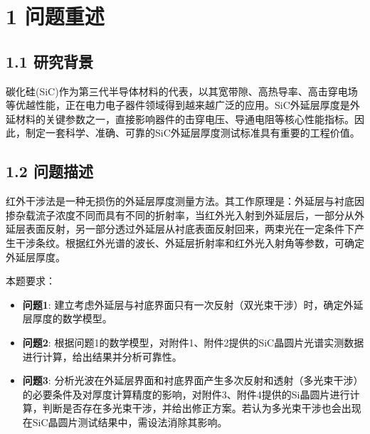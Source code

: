\documentclass[withoutpreface]{cumcmthesis}
\begin{document}
\maketitle

\begin{abstract}
本研究针对碳化硅(SiC)外延层厚度测量问题，基于红外干涉光谱法建立了完整的数学模型并实现了精确测量。针对问题1，建立了考虑外延层与衬底界面单次反射的双光束干涉模型，推导了厚度计算公式$d=1/(2n\Delta\sigma)$；针对问题2，设计了基于峰值检测和统计分析的厚度求解算法，对附件1、附件2的SiC晶圆片进行计算，得到SiC-1厚度为$24.58\,\mu\text{m}$，SiC-2厚度为$24.02\,\mu\text{m}$；针对问题3，深入分析了多光束Fabry-Perot干涉产生的必要条件，发现Si样品的干涉条纹对比度$K>0.99$，确认存在显著多光束干涉效应，而SiC样品$K\approx0.98$，表明其多光束效应相对较弱。对Si样品的分析得到Si-1厚度为$3.67\,\mu\text{m}$，Si-2厚度为$3.52\,\mu\text{m}$。研究结果表明，所建立的模型和算法能够有效测定SiC和Si外延层厚度，为半导体外延材料的无损检测提供了科学依据。

\textbf{关键词}: 红外干涉；外延层厚度；双光束干涉；多光束干涉；Fabry-Perot干涉仪；Sellmeier色散公式
\end{abstract}

\section{1 问题重述}

\subsection{1.1 研究背景}
碳化硅(SiC)作为第三代半导体材料的代表，以其宽带隙、高热导率、高击穿电场等优越性能，正在电力电子器件领域得到越来越广泛的应用。SiC外延层厚度是外延材料的关键参数之一，直接影响器件的击穿电压、导通电阻等核心性能指标。因此，制定一套科学、准确、可靠的SiC外延层厚度测试标准具有重要的工程价值。

\subsection{1.2 问题描述}
红外干涉法是一种无损伤的外延层厚度测量方法。其工作原理是：外延层与衬底因掺杂载流子浓度不同而具有不同的折射率，当红外光入射到外延层后，一部分从外延层表面反射，另一部分透过外延层从衬底表面反射回来，两束光在一定条件下产生干涉条纹。根据红外光谱的波长、外延层折射率和红外光入射角等参数，可确定外延层厚度。

本题要求：
\begin{itemize}
\item \textbf{问题1}: 建立考虑外延层与衬底界面只有一次反射（双光束干涉）时，确定外延层厚度的数学模型。
\item \textbf{问题2}: 根据问题1的数学模型，对附件1、附件2提供的SiC晶圆片光谱实测数据进行计算，给出结果并分析可靠性。
\item \textbf{问题3}: 分析光波在外延层界面和衬底界面产生多次反射和透射（多光束干涉）的必要条件及对厚度计算精度的影响，对附件3、附件4提供的Si晶圆片进行计算，判断是否存在多光束干涉，并给出修正方案。若认为多光束干涉也会出现在SiC晶圆片测试结果中，需设法消除其影响。
\end{itemize}
\end{document}
